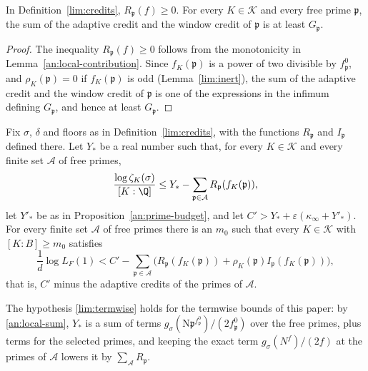 \begin{lemma}\label{lim:credit-sum}
In Definition~\ref{lim:credits}, $R_{\mathfrak p}(f)\ge0$. For every
$K\in\mathcal K$ and every free prime $\mathfrak p$, the sum of the adaptive
credit and the window credit of $\mathfrak p$ is at least $G_{\mathfrak p}$.
\end{lemma}

\begin{proof}
The inequality $R_{\mathfrak p}(f)\ge0$ follows from the monotonicity in
Lemma~\ref{an:local-contribution}. Since $f_K(\mathfrak p)$ is a power of two
divisible by $f^0_{\mathfrak p}$, and $\rho_K(\mathfrak p)=0$ if
$f_K(\mathfrak p)$ is odd (Lemma~\ref{lim:inert}), the sum of the adaptive
credit and the window credit of $\mathfrak p$ is one of the expressions in the
infimum defining $G_{\mathfrak p}$, and hence at least $G_{\mathfrak p}$.
\end{proof}

\begin{proposition}\label{lim:A}
Fix $\sigma$, $\delta$ and floors as in Definition~\ref{lim:credits}, with
the functions $R_{\mathfrak p}$ and $I_{\mathfrak p}$ defined there. Let
$Y_*$ be a real number such that, for every $K\in\mathcal K$ and every
finite set $\mathcal A$ of free primes,
\begin{equation}\label{lim:termwise}
 \frac{\log\zeta_K(\sigma)}{[K:\Q]}\le Y_*-\sum_{\mathfrak p\in\mathcal A}
 R_{\mathfrak p}(f_K(\mathfrak p)),
\end{equation}
let $Y'_*$ be as in Proposition~\ref{an:prime-budget}, and let
$C'>Y_*+\varepsilon(\kappa_\infty+Y'_*)$. For every finite set $\mathcal A$
of free primes there is an $m_0$ such that every $K\in\mathcal K$ with
$[K:B]\ge m_0$ satisfies
\[
 \frac1d\log L_F(1)<C'-\sum_{\mathfrak p\in\mathcal A}\bigl(R_{\mathfrak p}(f_K(\mathfrak p))
 +\rho_K(\mathfrak p)I_{\mathfrak p}(f_K(\mathfrak p))\bigr),
\]
that is, $C'$ minus the adaptive credits of the primes of $\mathcal A$.
\end{proposition}

\begin{remark}\label{lim:termwise-remark}
The hypothesis \eqref{lim:termwise} holds for the termwise bounds of this
paper: by \eqref{an:local-sum}, $Y_*$ is a sum of terms
$g_\sigma(\mathrm N\mathfrak p^{f^0_{\mathfrak p}})/(2f^0_{\mathfrak p})$ over the
free primes, plus terms for the selected primes, and keeping the exact term
$g_\sigma(N^f)/(2f)$ at the primes of $\mathcal A$ lowers it by
$\sum_{\mathcal A}R_{\mathfrak p}$.
\end{remark}

